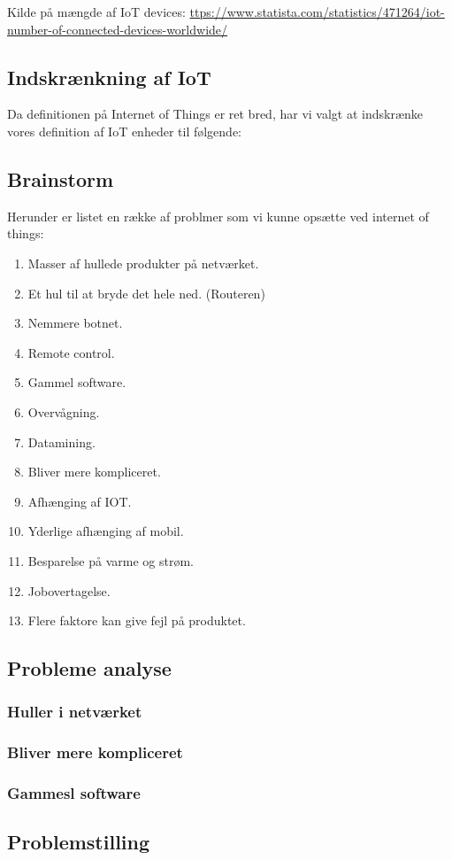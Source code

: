 Kilde på mængde af IoT devices: \url{ttps://www.statista.com/statistics/471264/iot-number-of-connected-devices-worldwide/}


\subsection{Indskrænkning af IoT}
Da definitionen på Internet of Things er ret bred, har vi valgt at indskrænke vores definition af IoT enheder til følgende:


\subsection{Brainstorm}
Herunder er listet en række af problmer som vi kunne opsætte ved internet of things:
\begin{enumerate}
    \item Masser af hullede produkter på netværket.
    \item Et hul til at bryde det hele ned. (Routeren)
    \item Nemmere botnet.
    \item Remote control.
    \item Gammel software.
    \item Overvågning.
    \item Datamining.
    \item Bliver mere kompliceret.
    \item Afhænging af IOT.
    \item Yderlige afhænging af mobil.
    \item Besparelse på varme og strøm.
    \item Jobovertagelse. 
    \item Flere faktore kan give fejl på produktet.
\end{enumerate}

\subsection{Probleme analyse}

\subsubsection{Huller i netværket}

\subsubsection{Bliver mere kompliceret}

\subsubsection{Gammesl software}



\subsection{Problemstilling}